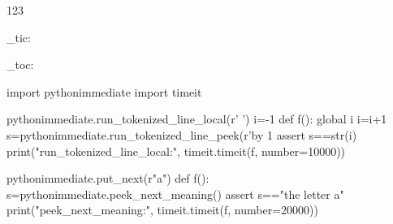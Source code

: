 \documentclass{article}
\begin{document}
123

\ExplSyntaxOn \benchmark_tic: \ExplSyntaxOff
\begin{pycode}

\end{pycode}
\ExplSyntaxOn \benchmark_toc: \ExplSyntaxOff

\begin{pycode}
import pythonimmediate
import timeit

pythonimmediate.run_tokenized_line_local(r'\newcount\counta {} ')
i=-1
def f():
	global i
	i=i+1
	s=pythonimmediate.run_tokenized_line_peek(r'\advance\counta by 1 \pythonimmediatecontinue{\the\counta}%
	assert s==str(i)
print("run_tokenized_line_local:", timeit.timeit(f, number=10000))

pythonimmediate.put_next(r"a")
def f():
	s=pythonimmediate.peek_next_meaning()
	assert s=="the letter a"
print("peek_next_meaning:", timeit.timeit(f, number=20000))


\end{pycode}
\end{document}

